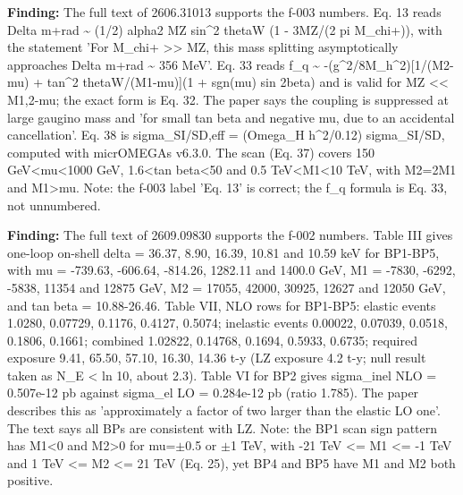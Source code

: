 \documentclass[11pt,a4paper]{article}
\begin{document}
\textbf{Finding:} The full text of 2606.31013 supports the f-003 numbers. Eq. 13 reads Delta m+\textbar{}rad \textasciitilde{} (1/2) alpha2 MZ sin\textasciicircum{}2 thetaW (1 - 3MZ/(2 pi M\_chi+)), with the statement 'For M\_chi+ \textgreater{}\textgreater{} MZ, this mass splitting asymptotically approaches Delta m+\textbar{}rad \textasciitilde{} 356 MeV'. Eq. 33 reads f\_q \textasciitilde{} -(g\textasciicircum{}2/8M\_h\textasciicircum{}2)[1/(M2-\textbar{}mu\textbar{}) + tan\textasciicircum{}2 thetaW/(M1-\textbar{}mu\textbar{})](1 + sgn(mu) sin 2beta) and is valid for MZ \textless{}\textless{} M1,2-\textbar{}mu\textbar{}; the exact form is Eq. 32. The paper says the coupling is suppressed at large gaugino mass and 'for small tan beta and negative mu, due to an accidental cancellation'. Eq. 38 is sigma\_SI/SD,eff = (Omega\_H h\textasciicircum{}2/0.12) sigma\_SI/SD, computed with micrOMEGAs v6.3.0. The scan (Eq. 37) covers 150 GeV\textless{}\textbar{}mu\textbar{}\textless{}1000 GeV, 1.6\textless{}tan beta\textless{}50 and 0.5 TeV\textless{}M1\textless{}10 TeV, with M2=2M1 and M1\textgreater{}\textbar{}mu\textbar{}. Note: the f-003 label 'Eq. 13' is correct; the f\_q formula is Eq. 33, not unnumbered.

\textbf{Finding:} The full text of 2609.09830 supports the f-002 numbers. Table III gives one-loop on-shell delta = 36.37, 8.90, 16.39, 10.81 and 10.59 keV for BP1-BP5, with mu = -739.63, -606.64, -814.26, 1282.11 and 1400.0 GeV, M1 = -7830, -6292, -5838, 11354 and 12875 GeV, M2 = 17055, 42000, 30925, 12627 and 12050 GeV, and tan beta = 10.88-26.46. Table VII, NLO rows for BP1-BP5: elastic events 1.0280, 0.07729, 0.1176, 0.4127, 0.5074; inelastic events 0.00022, 0.07039, 0.0518, 0.1806, 0.1661; combined 1.02822, 0.14768, 0.1694, 0.5933, 0.6735; required exposure 9.41, 65.50, 57.10, 16.30, 14.36 t-y (LZ exposure 4.2 t-y; null result taken as N\_E \textless{} ln 10, about 2.3). Table VI for BP2 gives sigma\_inel NLO = 0.507e-12 pb against sigma\_el LO = 0.284e-12 pb (ratio 1.785). The paper describes this as 'approximately a factor of two larger than the elastic LO one'. The text says all BPs are consistent with LZ. Note: the BP1 scan sign pattern has M1\textless{}0 and M2\textgreater{}0 for mu=$\pm$0.5 or $\pm$1 TeV, with -21 TeV \textless{}= M1 \textless{}= -1 TeV and 1 TeV \textless{}= M2 \textless{}= 21 TeV (Eq. 25), yet BP4 and BP5 have M1 and M2 both positive.
\end{document}

